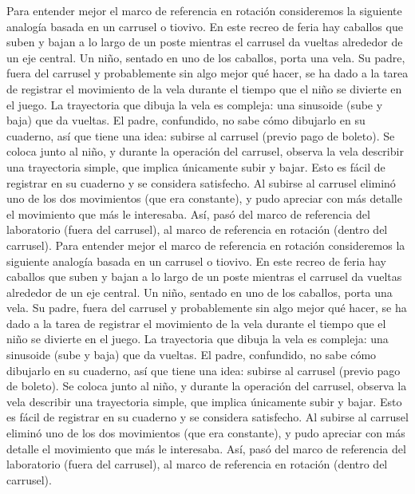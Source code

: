 Para entender mejor el marco de referencia en rotación consideremos la siguiente analogía basada en un carrusel o tiovivo. En este recreo de feria hay caballos que suben y bajan a lo largo de un poste mientras el carrusel da vueltas alrededor de un eje central. Un niño, sentado en uno de los caballos, porta una vela. Su padre, fuera del carrusel y probablemente sin algo mejor qué hacer, se ha dado a la tarea de registrar el movimiento de la vela durante el tiempo que el niño se divierte en el juego. La trayectoria que dibuja la vela es compleja: una sinusoide (sube y baja) que da vueltas. El padre, confundido, no sabe cómo dibujarlo en su cuaderno, así que tiene una idea: subirse al carrusel (previo pago de boleto). Se coloca junto al niño, y durante la operación del carrusel, observa la vela describir una trayectoria simple, que implica únicamente subir y bajar. Esto es fácil de registrar en su cuaderno y se considera satisfecho. Al subirse al carrusel eliminó uno de los dos movimientos (que era constante), y pudo apreciar con más detalle el movimiento que más le interesaba. Así, pasó del marco de referencia del laboratorio (fuera del carrusel), al marco de referencia en rotación (dentro del carrusel). 
Para entender mejor el marco de referencia en rotación consideremos la siguiente analogía basada en un carrusel o tiovivo. En este recreo de feria hay caballos que suben y bajan a lo largo de un poste mientras el carrusel da vueltas alrededor de un eje central. Un niño, sentado en uno de los caballos, porta una vela. Su padre, fuera del carrusel y probablemente sin algo mejor qué hacer, se ha dado a la tarea de registrar el movimiento de la vela durante el tiempo que el niño se divierte en el juego. La trayectoria que dibuja la vela es compleja: una sinusoide (sube y baja) que da vueltas. El padre, confundido, no sabe cómo dibujarlo en su cuaderno, así que tiene una idea: subirse al carrusel (previo pago de boleto). Se coloca junto al niño, y durante la operación del carrusel, observa la vela describir una trayectoria simple, que implica únicamente subir y bajar. Esto es fácil de registrar en su cuaderno y se considera satisfecho. Al subirse al carrusel eliminó uno de los dos movimientos (que era constante), y pudo apreciar con más detalle el movimiento que más le interesaba. Así, pasó del marco de referencia del laboratorio (fuera del carrusel), al marco de referencia en rotación (dentro del carrusel). 


